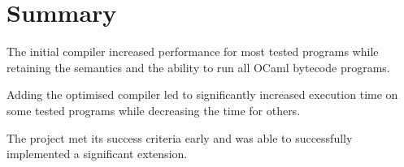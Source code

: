 \section{Summary}

The initial compiler increased performance for most tested programs while retaining the semantics
and the
ability to run all OCaml bytecode programs.

Adding the optimised compiler led to significantly increased execution time on some tested programs
while decreasing the time for others.

The project met its success criteria early and was able to successfully implemented a significant
extension.